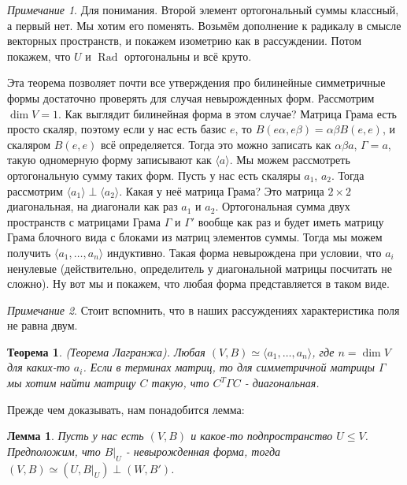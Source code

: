 \documentclass[a4paper,100pt]{article}
\theoremstyle{indented}
\newtheorem{theorem}{Теорема}
\newtheorem{lemma}{Лемма}
\theoremstyle{definition}
\theoremstyle{remark}
\newtheorem{remark}{Примечание}
\DeclareMathOperator{\Rad}{Rad}
\begin{document}
\begin{remark}
    Для понимания. Второй элемент ортогональный суммы классный, а первый нет. Мы хотим его поменять. Возьмём дополнение к радикалу в смысле векторных пространств, и покажем изометрию как в рассуждении. Потом покажем, что $U$ и $\Rad$ ортогональны и всё круто.
\end{remark}

Эта теорема позволяет почти все утверждения про билинейные симметричные формы достаточно проверять для случая невырожденных форм. Рассмотрим $\dim V = 1$. Как выглядит билинейная форма в этом случае? Матрица Грама есть просто скаляр, поэтому если у нас есть базис $e$, то $B(e\alpha, e\beta)= \alpha\beta B(e, e)$, и скаляром $B(e, e)$ всё определяется. Тогда это можно записать как $\alpha \beta a$, $\Gamma = a$, такую одномерную форму записывают как $\langle a \rangle$. Мы можем рассмотреть ортогональную сумму таких форм. Пусть у нас есть скаляры $a_1$, $a_2$. Тогда рассмотрим $\langle a_1 \rangle \perp \langle a_2 \rangle$. Какая у неё матрица Грама? Это матрица $2\times 2$ диагональная, на диагонали как раз $a_1$ и $a_2$. Ортогональная сумма двух пространств с матрицами Грама $\Gamma$ и $\Gamma'$ вообще как раз и будет иметь матрицу Грама блочного вида с блоками из матриц элементов суммы. Тогда мы можем получить $\langle a_1, \ldots, a_n\rangle $ индуктивно. Такая форма невырождена при условии, что $a_i$ ненулевые (действительно, определитель у диагональной матрицы посчитать не сложно). Ну вот мы и покажем, что любая форма представляется в таком виде. 

\begin{remark}
    Стоит вспомнить, что в наших рассуждениях характеристика поля не равна двум.
\end{remark}

\begin{theorem}
    (Теорема Лагранжа). Любая $(V, B)\simeq \langle a_1, \ldots, a_n \rangle$, где $n=\dim V$ для каких-то $a_i$. Если в терминах матриц, то для симметричной матрицы $\Gamma$ мы хотим найти матрицу $C$ такую, что $C^T\Gamma C$ - диагональная.
\end{theorem}

Прежде чем доказывать, нам понадобится лемма:\\ 

\begin{lemma}
    Пусть у нас есть $(V, B)$ и какое-то подпространство $U\leq V$. Предположим, что $B\bigg|_U$ - невырожденная форма, тогда $(V, B)\simeq (U, B\bigg|_U)\perp(W, B')$. 
\end{lemma}
\end{document}
